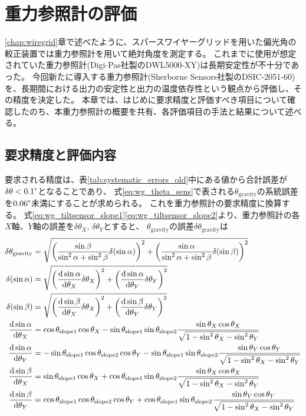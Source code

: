 \documentclass[../../main.tex]{subfiles}
\begin{document}
\chapter{重力参照計の評価}
\label{chap:tiltsensor}

\ref{chap:wiregrid}章で述べたように、スパースワイヤーグリッドを用いた偏光角の較正装置では重力参照計を用いて絶対角度を測定する。
これまでに使用が想定されていた重力参照計(Digi-Pas社製のDWL5000-XY)は長期安定性が不十分であった。
今回新たに導入する重力参照計(Sherborne Sensors社製のDSIC-2051-60)を、長期間における出力の安定性と出力の温度依存性という観点から評価し、その精度を決定した。
本章では、はじめに要求精度と評価すべき項目について確認したのち、本重力参照計の概要を共有、各評価項目の手法と結果について述べる。
\section{要求精度と評価内容}
要求される精度は、表\ref{tab:systematic_errors_old}中にある値から合計誤差が$\delta\theta < 0.1\tcdegree$となることであり、
式\eqref{eq:wg_theta_sens}で表される$\theta_{\mathrm{gravity}}$の系統誤差を$0.06\tcdegree$未満にすることが求められる。
これを重力参照計の要求精度に換算する。
式\eqref{eq:wg_tiltsensor_slope1}\eqref{eq:wg_tiltsensor_slope2}より、重力参照計の各$X$軸、$Y$軸の誤差を$\delta\theta_{X},\,\delta\theta_{Y}$とすると、
$\theta_{\mathrm{gravity}}$の誤差$\delta\theta_{\mathrm{gravity}}$は
\begin{align}
    \label{eq:gosadenpa1}
    \delta\theta_{\mathrm{gravity}} &= 
        \sqrt{\qty(\dfrac{\sin\beta}{\sin^2\alpha+\sin^2\beta} \delta\qty(\sin\alpha))^2 + \qty(\dfrac{\sin\alpha}{\sin^2\alpha+\sin^2\beta} \delta\qty(\sin\beta))^2}\\ 
    \delta\qty(\sin\alpha) &= \sqrt{\qty(\dv{\sin\alpha}{\theta_X}\delta\theta_X)^2+\qty(\dv{\sin\alpha}{\theta_Y}\delta\theta_Y)^2}\\
    \delta\qty(\sin\beta) &= \sqrt{\qty(\dv{\sin\beta}{\theta_X}\delta\theta_X)^2+\qty(\dv{\sin\beta}{\theta_Y}\delta\theta_Y)^2} \\
    \dv{\sin\alpha}{\theta_X} &= \cos\theta_{\mathrm{slope}1}\cos\theta_X - \sin\theta_{\mathrm{slope}1}\sin\theta_{\mathrm{slope}2}\dfrac{\sin\theta_X\cos\theta_X}{\sqrt{1-\sin^2\theta_X-\sin^2\theta_Y}} \\
    \dv{\sin\alpha}{\theta_Y} &= -\sin\theta_{\mathrm{slope}1}\cos\theta_{\mathrm{slope}2}\cos\theta_Y - \sin\theta_{\mathrm{slope}1}\sin\theta_{\mathrm{slope}2}\dfrac{\sin\theta_Y\cos\theta_Y}{\sqrt{1-\sin^2\theta_X-\sin^2\theta_Y}} \\
    \dv{\sin\beta}{\theta_X} &= \sin\theta_{\mathrm{slope}1}\cos\theta_X + \cos\theta_{\mathrm{slope}1}\sin\theta_{\mathrm{slope}2}\dfrac{\sin\theta_X\cos\theta_X}{\sqrt{1-\sin^2\theta_X-\sin^2\theta_Y}} \\
    \label{eq:gosadnepa2}
    \dv{\sin\beta}{\theta_Y} &= \cos\theta_{\mathrm{slope}1}\cos\theta_{\mathrm{slope}2}\cos\theta_Y + \cos\theta_{\mathrm{slope}1}\sin\theta_{\mathrm{slope}2}\dfrac{\sin\theta_Y\cos\theta_Y}{\sqrt{1-\sin^2\theta_X-\sin^2\theta_Y}}
\end{align}
\end{document}
